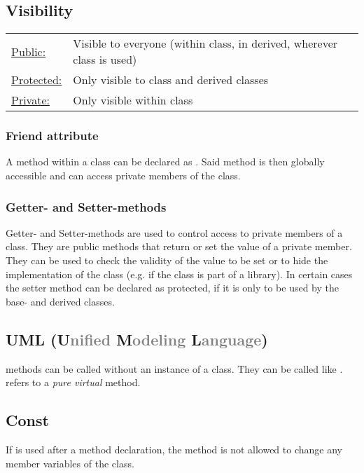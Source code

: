 \subsection{Visibility}
    \begin{tabularx}{\columnwidth}{@{}l X@{}}
        \underline{Public:}       & Visible to everyone (within class, in derived, wherever class is used)\\
        \underline{Protected:}    & Only visible to class and derived classes\\
        \underline{Private:}      & Only visible within class
    \end{tabularx}
    
    \subsubsection{Friend attribute}
    A method within a class can be declared as . Said method is then globally accessible and can access private members of the class.

    \subsubsection{Getter- and Setter-methods}
    Getter- and Setter-methods are used to control access to private members of a class. 
    They are public methods that return or set the value of a private member. 
    They can be used to check the validity of the value to be set or to hide the implementation of the class (e.g. if the class is part of a library).
    In certain cases the setter method can be declared as protected, if it is only to be used by the base- and derived classes.

    \subsection{UML (U\textcolor{gray}{nified} M\textcolor{gray}{odeling} L\textcolor{gray}{anguage})}
    \begin{center}
        
    \end{center}
    \vspace{-2mm}
     methods can be called without an instance of a class. They can be called like .  refers to a \textit{pure virtual} method.
    
\subsection{Const}
    If  is used after a method declaration, the method is not allowed to change any member variables of the class.


